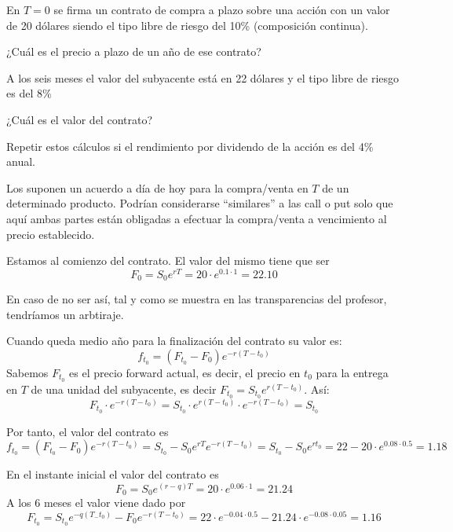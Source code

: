 \begin{problem}[1]
En $T=0$ se firma un contrato de compra a plazo sobre una acción con un valor de 20 dólares siendo el tipo libre de riesgo del 10\% (composición continua).

\ppart ¿Cuál es el precio a plazo de un año de ese contrato?

A los seis meses el valor del subyacente está en 22 dólares y el tipo libre de riesgo es del 8\%

\ppart ¿Cuál es el valor del contrato?

\ppart Repetir estos cálculos si el rendimiento por dividendo de la acción es del 4\% anual.

\solution
{}

Los  suponen un acuerdo a día de hoy para la compra/venta en $T$ de un determinado producto. Podrían considerarse ``similares'' a las call o put solo que aquí ambas partes están obligadas a efectuar la compra/venta a vencimiento al precio establecido.

\spart
Estamos al comienzo del contrato. El valor del mismo tiene que ser
\[F_0 = S_0e^{rT} = 20 \cdot e^{0.1\cdot 1} = 22.10\]

En caso de no ser así, tal y como se muestra en las transparencias del profesor, tendríamos un arbtiraje.

\spart Cuando queda medio año para la finalización del contrato su valor es:
\[f_{t_0} = (F_{t_0}-F_0)e^{-r(T-t_0)}\]
Sabemos $F_{t_0}$ es el precio forward actual, es decir, el precio en $t_0$ para la entrega en $T$ de una unidad del subyacente, es decir $F_{t_0} = S_{t_0}e^{r(T-t_0)}$. Así:
\[F_{t_0} \cdot e^{-r(T-t_0)} = S_{t_0}\cdot e^{r(T-t_0)}  \cdot e^{-r(T-t_0)} =S_{t_0}\]

Por tanto, el valor del contrato es
\[f_{t_0} = (F_{t_0}-F_0)e^{-r(T-t_0)} = S_{t_0}-S_0e^{rT}e^{-r(T-t_0)} = S_{t_0}-S_0e^{rt_0} = 22 - 20\cdot e^{0.08\cdot 0.5} = 1.18 \]


\spart
En el instante inicial el valor del contrato es
\[F_0 = S_0e^{(r-q)T} = 20 \cdot e^{0.06\cdot 1} = 21.24\]
A los 6 meses el valor viene dado por
\[F_{t_0} = S_{t_0}e^{-q(T_-t_0)}-F_0e^{-r(T-t_0)} = 22\cdot e^{-0.04\cdot 0.5} - 21.24\cdot e^{-0.08\cdot 0.05} = 1.16\]


\end{problem}

